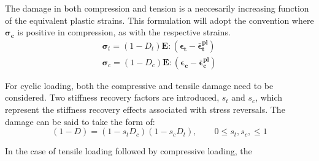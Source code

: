 The damage in both compression and tension is a neccesarily increasing
function of the equivalent plastic strains. This formulation will
adopt the convention where $\boldsymbol{\mathbf{\sigma}_{c}}$ is
positive in compression, as with the respective strains. 
\begin{equation}
\begin{array}{c}
\boldsymbol{\sigma}_{t}=(1-D_{t})\mathbf{E}:(\boldsymbol{\epsilon_{t}}-\boldsymbol{\bar{\epsilon}_{t}^{pl}})\\
\boldsymbol{\sigma}_{c}=(1-D_{c})\mathbf{E}:(\boldsymbol{\epsilon_{c}}-\boldsymbol{\bar{\epsilon}_{c}^{pl}})
\end{array}
\label{eqn:dam3}
\end{equation}


For cyclic loading, both the compressive and tensile damage need to
be considered. Two stiffness recovery factors are introduced, $s_{t}$
and $s_{c}$, which represent the stiffness recovery effects associated
with stress reversals. The damage can be said to take the form of:
\begin{equation}
(1-D)=(1-s_{t}D_{c})(1-s_{c}D_{t}),\qquad0\leq s_{t},s_{c},\leq1\label{eqn:dam4}
\end{equation}


In the case of tensile loading followed by compressive loading, the
